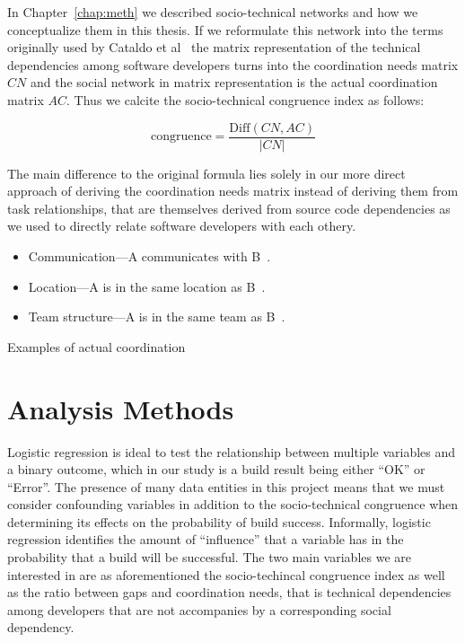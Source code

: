 %
In Chapter~\ref{chap:meth} we described socio-technical networks and how we conceptualize them in this thesis.
If we reformulate this network into the terms originally used by Cataldo et al~\cite{cataldo:cscw:2006} the matrix representation of the technical dependencies among software developers turns into the coordination needs matrix $CN$ and the social network in matrix representation is the actual coordination matrix $AC$.
Thus we calcite the socio-technical congruence index as follows:

\[ \text{congruence} = \frac{\text{Diff}(CN, AC)}  {|CN|} \]

The main difference to the original formula lies solely in our more direct approach of deriving the coordination needs matrix instead of deriving them from task relationships, that are themselves derived from source code dependencies as we used to directly relate software developers with each othery.

\begin{placeholder}[t]
\begin{itemize}
\item Communication---A communicates with B~\cite{cataldo:cscw:2006, ehrlich:stc:2008, cataldo:esem:2008,damian2007:collaboration}.
\item Location---A is in the same location as B~\cite{cataldo:cscw:2006, ehrlich:stc:2008}.
\item Team structure---A is in the same team as B~\cite{cataldo:cscw:2006}.
\end{itemize}
\caption{Examples of actual coordination}
\label{ph:relationships}
\end{placeholder}


\section{Analysis Methods}
\label{sec:methodology}
Logistic regression is ideal to test the relationship between multiple variables and a binary outcome, which in our study is a build result being either ``OK'' or ``Error''. The presence of many data entities in this project means that we must consider confounding variables in addition to the socio-technical congruence when determining its effects on the probability of build success. Informally, logistic regression identifies the amount of ``influence'' that a variable has in the probability that a build will be successful.
The two main variables we are interested in are as aforementioned the socio-techincal congruence index as well as the ratio between gaps and coordination needs, that is technical dependencies among developers that are not accompanies by a corresponding social dependency.

